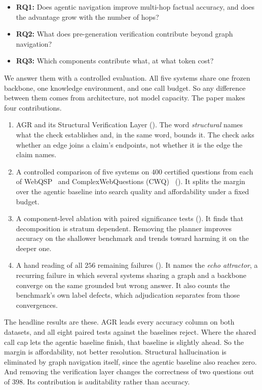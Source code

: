 \begin{itemize}
\item \textbf{RQ1:} Does agentic navigation improve multi-hop factual accuracy,
  and does the advantage grow with the number of hops?
\item \textbf{RQ2:} What does pre-generation verification contribute beyond
  graph navigation?
\item \textbf{RQ3:} Which components contribute what, at what token cost?
\end{itemize}

We answer them with a controlled evaluation. All five systems share one frozen
backbone, one knowledge environment, and one call budget. So any difference
between them comes from architecture, not model capacity. The paper makes four
contributions.

\begin{enumerate}
\item AGR and its Structural Verification Layer (). The word
  \emph{structural} names what the check establishes and, in the same word,
  bounds it. The check asks whether an edge joins a claim's endpoints, not
  whether it is the edge the claim names.
\item A controlled comparison of five systems on $400$ certified questions from
  each of WebQSP~\cite{yih2016value} and
  ComplexWebQuestions (CWQ)~\cite{talmor2018web}
  (). It
  splits the margin over the agentic baseline into search quality and
  affordability under a fixed budget.
\item A component-level ablation with paired significance tests
  (). It finds that
  decomposition is stratum dependent. Removing the planner improves accuracy on
  the shallower benchmark and trends toward harming it on the deeper one.
\item A hand reading of all $256$ remaining failures (). It
  names the \emph{echo attractor}, a recurring failure in which several systems
  sharing a graph and a backbone converge on the same grounded but wrong answer.
  It also counts the benchmark's own label defects, which adjudication separates
  from those convergences.
\end{enumerate}

The headline results are these. AGR leads every accuracy column on both
datasets, and all eight paired tests against the baselines reject. Where the
shared call cap lets the agentic baseline finish, that baseline is slightly
ahead. So the margin is affordability, not better resolution. Structural
hallucination is eliminated by graph navigation itself, since the agentic
baseline also reaches zero. And removing the verification layer changes the
correctness of two questions out of $398$. Its contribution is auditability
rather than accuracy.

